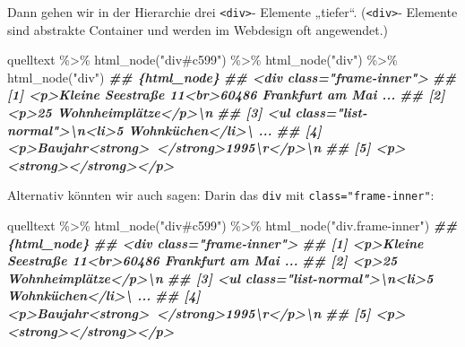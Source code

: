 \documentclass[
  ngerman,
]{article}
\newenvironment{Shaded}{\begin{snugshade}}{\end{snugshade}}
\newcommand{\DocumentationTok}[1]{\textcolor[rgb]{0.56,0.35,0.01}{\textbf{\textit{#1}}}}
\newcommand{\FunctionTok}[1]{\textcolor[rgb]{0.00,0.00,0.00}{#1}}
\newcommand{\NormalTok}[1]{#1}
\newcommand{\SpecialCharTok}[1]{\textcolor[rgb]{0.00,0.00,0.00}{#1}}
\newcommand{\StringTok}[1]{\textcolor[rgb]{0.31,0.60,0.02}{#1}}
\begin{document}
Dann gehen wir in der Hierarchie drei \texttt{\textless{}div\textgreater{}}- Elemente „tiefer``. (\texttt{\textless{}div\textgreater{}}- Elemente sind abstrakte Container und werden im Webdesign oft angewendet.)

\begin{Shaded}
\begin{Highlighting}[]
\NormalTok{quelltext }\SpecialCharTok{\%\textgreater{}\%}
  \FunctionTok{html\_node}\NormalTok{(}\StringTok{"div\#c599"}\NormalTok{) }\SpecialCharTok{\%\textgreater{}\%}
  \FunctionTok{html\_node}\NormalTok{(}\StringTok{"div"}\NormalTok{) }\SpecialCharTok{\%\textgreater{}\%}
  \FunctionTok{html\_node}\NormalTok{(}\StringTok{"div"}\NormalTok{)}
\DocumentationTok{\#\# \{html\_node\}}
\DocumentationTok{\#\# \textless{}div class="frame{-}inner"\textgreater{}}
\DocumentationTok{\#\# [1] \textless{}p\textgreater{}Kleine Seestraße 11\textless{}br\textgreater{}60486 Frankfurt am Mai ...}
\DocumentationTok{\#\# [2] \textless{}p\textgreater{}25 Wohnheimplätze\textless{}/p\textgreater{}\textbackslash{}n}
\DocumentationTok{\#\# [3] \textless{}ul class="list{-}normal"\textgreater{}\textbackslash{}n\textless{}li\textgreater{}5 Wohnküchen\textless{}/li\textgreater{}\textbackslash{} ...}
\DocumentationTok{\#\# [4] \textless{}p\textgreater{}Baujahr\textless{}strong\textgreater{} \textless{}/strong\textgreater{}1995\textbackslash{}r\textless{}/p\textgreater{}\textbackslash{}n}
\DocumentationTok{\#\# [5] \textless{}p\textgreater{}\textless{}strong\textgreater{}\textless{}/strong\textgreater{}\textless{}/p\textgreater{}}
\end{Highlighting}
\end{Shaded}

Alternativ könnten wir auch sagen: Darin das \texttt{div} mit \texttt{class="frame-inner"}:

\begin{Shaded}
\begin{Highlighting}[]
\NormalTok{quelltext }\SpecialCharTok{\%\textgreater{}\%}
  \FunctionTok{html\_node}\NormalTok{(}\StringTok{"div\#c599"}\NormalTok{) }\SpecialCharTok{\%\textgreater{}\%}
  \FunctionTok{html\_node}\NormalTok{(}\StringTok{"div.frame{-}inner"}\NormalTok{)}
\DocumentationTok{\#\# \{html\_node\}}
\DocumentationTok{\#\# \textless{}div class="frame{-}inner"\textgreater{}}
\DocumentationTok{\#\# [1] \textless{}p\textgreater{}Kleine Seestraße 11\textless{}br\textgreater{}60486 Frankfurt am Mai ...}
\DocumentationTok{\#\# [2] \textless{}p\textgreater{}25 Wohnheimplätze\textless{}/p\textgreater{}\textbackslash{}n}
\DocumentationTok{\#\# [3] \textless{}ul class="list{-}normal"\textgreater{}\textbackslash{}n\textless{}li\textgreater{}5 Wohnküchen\textless{}/li\textgreater{}\textbackslash{} ...}
\DocumentationTok{\#\# [4] \textless{}p\textgreater{}Baujahr\textless{}strong\textgreater{} \textless{}/strong\textgreater{}1995\textbackslash{}r\textless{}/p\textgreater{}\textbackslash{}n}
\DocumentationTok{\#\# [5] \textless{}p\textgreater{}\textless{}strong\textgreater{}\textless{}/strong\textgreater{}\textless{}/p\textgreater{}}
\end{Highlighting}
\end{Shaded}
\end{document}
